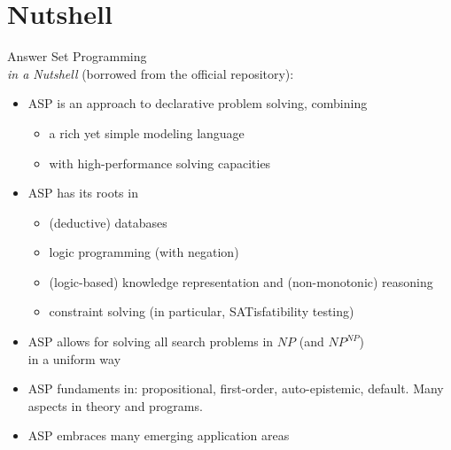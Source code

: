 \documentclass{beamer}
\begin{document}
\section{Nutshell}
\begin{frame}{Answer Set Programming\\[-2pt]{\small\emph{in a Nutshell}  (borrowed from the official repository):} }
  \begin{itemize}
  \item <2->
    ASP is an approach to \alert{declarative problem solving},   combining
    \begin{itemize}
    \item a rich yet simple modeling language
    \item with high-performance solving capacities
    \end{itemize}
  \item <3-> ASP has its roots in
    \begin{itemize}
    \item (deductive) databases
    \item logic programming (with negation)
    \item (logic-based) knowledge representation and (non-monotonic) reasoning
    \item constraint solving (in particular, SATisfatibility testing)
    \end{itemize}
  \item <4-6>
    ASP allows for solving all search problems in $NP$ (and $NP^{NP}$)
    \\in a uniform way %
  \item <5-6>
    ASP fundaments in: propositional, first-order, auto-epistemic, default. Many aspects in theory and programs.
  \item <6-6> ASP embraces many emerging application areas
  \end{itemize}
\end{frame}
\end{document}
